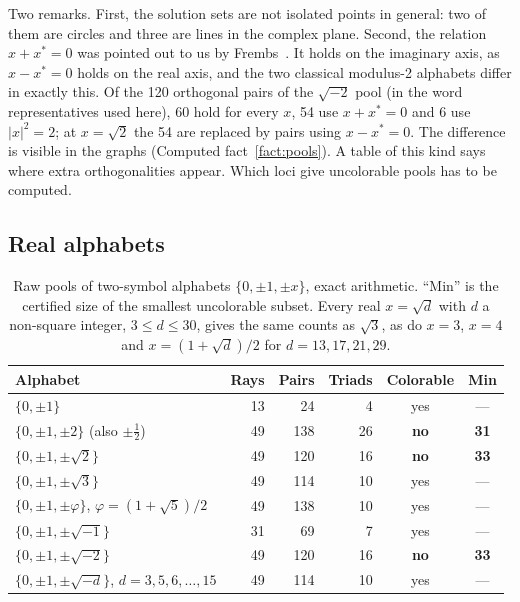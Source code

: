 Two remarks.  First, the solution sets are not isolated points in general: two of them are
circles and three are lines in the complex plane.  Second, the relation $x+x^{*}=0$ was pointed
out to us by Frembs~\cite{Frembs2026}.  It holds on the imaginary axis, as $x-x^{*}=0$ holds on
the real axis, and the two classical modulus-2 alphabets differ in exactly this.  Of the 120
orthogonal pairs of the $\sqrt{-2}$ pool (in the word representatives used here), 60 hold for
every $x$, 54 use $x+x^{*}=0$ and 6 use $|x|^2=2$; at $x=\sqrt2$ the 54 are replaced by pairs
using $x-x^{*}=0$.  The difference is visible in the graphs (Computed fact~\ref{fact:pools}).
A table of this kind says where extra orthogonalities appear.  Which loci give uncolorable
pools has to be computed.

\subsection{Real alphabets}

\begin{table}[t]
\centering
\caption{Raw pools of two-symbol alphabets $\{0,\pm1,\pm x\}$, exact arithmetic.  ``Min'' is the
certified size of the smallest uncolorable subset.  Every real $x=\sqrt d$ with $d$ a non-square
integer, $3\le d\le30$, gives the same counts as $\sqrt3$, as do $x=3$, $x=4$ and
$x=(1+\sqrt d)/2$ for $d=13,17,21,29$.}
\label{tab:alphabets}
\begin{tabular}{lrrrcc}
\toprule
Alphabet & Rays & Pairs & Triads & Colorable & Min \\
\midrule
$\{0,\pm1\}$ & 13 & 24 & 4 & yes & --- \\
$\{0,\pm1,\pm2\}$ (also $\pm\tfrac12$) & 49 & 138 & 26 & \textbf{no} & \textbf{31} \\
$\{0,\pm1,\pm\sqrt2\}$ & 49 & 120 & 16 & \textbf{no} & \textbf{33} \\
$\{0,\pm1,\pm\sqrt3\}$ & 49 & 114 & 10 & yes & --- \\
$\{0,\pm1,\pm\varphi\}$, $\varphi=(1+\sqrt5)/2$ & 49 & 138 & 10 & yes & --- \\
\midrule
$\{0,\pm1,\pm\sqrt{-1}\}$ & 31 & 69 & 7 & yes & --- \\
$\{0,\pm1,\pm\sqrt{-2}\}$ & 49 & 120 & 16 & \textbf{no} & \textbf{33} \\
$\{0,\pm1,\pm\sqrt{-d}\}$, $d=3,5,6,\dots,15$ & 49 & 114 & 10 & yes & --- \\
\bottomrule
\end{tabular}
\end{table}

